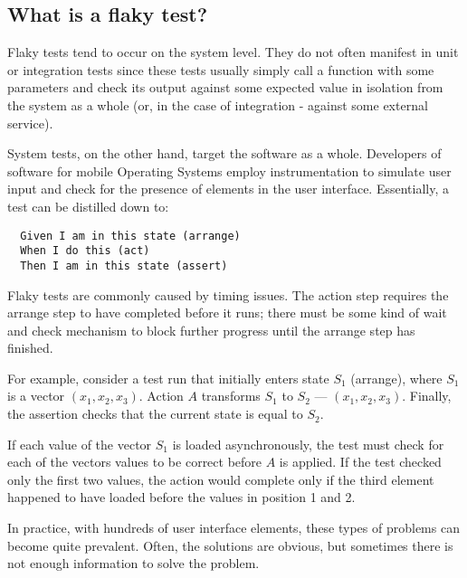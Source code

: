 \subsection{What is a flaky test?}
Flaky tests tend to occur on the system level. They do not often manifest in unit or integration tests since these tests usually simply call a function with some parameters and check its output against some expected value in isolation from the system as a whole (or, in the case of integration - against some external service).

System tests, on the other hand, target the software as a whole. Developers of software for mobile Operating Systems employ instrumentation to simulate user input and check for the presence of elements in the user interface. Essentially, a test can be distilled down to:
\begin{verbatim}
  Given I am in this state (arrange)
  When I do this (act)
  Then I am in this state (assert)
\end{verbatim}

Flaky tests are commonly caused by timing issues. The action step requires the arrange step to have completed before it runs; there must be some kind of wait and check mechanism to block further progress until the arrange step has finished.

For example, consider a test run that initially enters state $S_{1}$ (arrange), where $S_{1}$ is a vector $(x_{1},x_{2},x_{3})$. Action $A$ transforms $S_1$ to $S_2$ --- $(x_{1},x_{2},x_{3})$. Finally, the assertion checks that the current state is equal to $S_2$.

If each value of the vector $S_{1}$ is loaded asynchronously, the test must check for each of the vectors values to be correct before $A$ is applied. If the test checked only the first two values, the action would complete only if the third element happened to have loaded before the values in position 1 and 2.

In practice, with hundreds of user interface elements, these types of problems can become quite prevalent. Often, the solutions are obvious, but sometimes there is not enough information to solve the problem.
